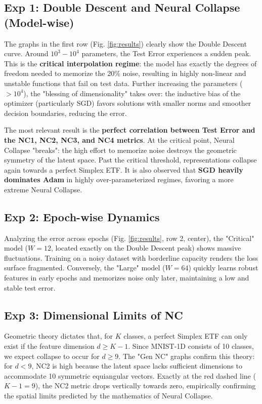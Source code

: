 \documentclass[10pt,twocolumn,letterpaper]{article}
\begin{document}
\subsection{Exp 1: Double Descent and Neural Collapse (Model-wise)}
The graphs in the first row (Fig. \ref{fig:results}) clearly show the Double Descent curve. Around $10^3-10^4$ parameters, the Test Error experiences a sudden peak. This is the \textbf{critical interpolation regime}: the model has exactly the degrees of freedom needed to memorize the 20\% noise, resulting in highly non-linear and unstable functions that fail on test data.
Further increasing the parameters ($>10^4$), the "blessing of dimensionality" takes over: the inductive bias of the optimizer (particularly SGD) favors solutions with smaller norms and smoother decision boundaries, reducing the error.

The most relevant result is the \textbf{perfect correlation between Test Error and the NC1, NC2, NC3, and NC4 metrics}. At the critical point, Neural Collapse "breaks": the high effort to memorize noise destroys the geometric symmetry of the latent space. Past the critical threshold, representations collapse again towards a perfect Simplex ETF. It is also observed that \textbf{SGD heavily dominates Adam} in highly over-parameterized regimes, favoring a more extreme Neural Collapse.

\subsection{Exp 2: Epoch-wise Dynamics}
Analyzing the error across epochs (Fig. \ref{fig:results}, row 2, center), the "Critical" model ($W=12$, located exactly on the Double Descent peak) shows massive fluctuations. Training on a noisy dataset with borderline capacity renders the loss surface fragmented. Conversely, the "Large" model ($W=64$) quickly learns robust features in early epochs and memorizes noise only later, maintaining a low and stable test error.

\subsection{Exp 3: Dimensional Limits of NC}
Geometric theory dictates that, for $K$ classes, a perfect Simplex ETF can only exist if the feature dimension $d \ge K-1$. Since MNIST-1D consists of 10 classes, we expect collapse to occur for $d \ge 9$.
The "Gen NC" graphs confirm this theory: for $d < 9$, NC2 is high because the latent space lacks sufficient dimensions to accommodate 10 symmetric equiangular vectors. Exactly at the red dashed line ($K-1=9$), the NC2 metric drops vertically towards zero, empirically confirming the spatial limits predicted by the mathematics of Neural Collapse.
\end{document}
